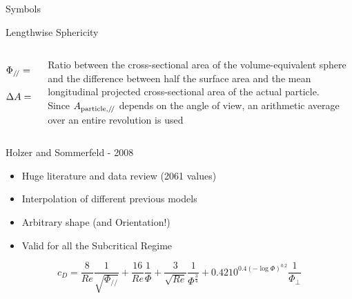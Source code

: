 \documentclass[11pt]{beamer}
\begin{document}
	\begin{frame}{Symbols}
		\begin{block}{Lengthwise Sphericity}
			\begin{columns}[T]
				\begin{column}{.4\textwidth}
					\begin{equation*}
					\Phi_{/\!/} = \dfrac{\frac{\pi}{4}\ d_{\textup{v}}^2} {\Delta A}
					\end{equation*}	
					\vfill		
					\begin{equation*}
					\Delta A = \dfrac{A_{\textup{p}}}{2} - \bar{A_{\textup{p},/\!/}}
					\end{equation*}
				\end{column}
				
				\begin{column}{.6\textwidth}
					Ratio between the cross-sectional area of the volume-equivalent sphere and the difference between half the surface area and the mean longitudinal projected cross-sectional area of the actual particle.\\
					Since $ A_{\textup{particle},/\!/} $ depends on the angle of view, an arithmetic average over an entire revolution is used
				\end{column}
			\end{columns}
		\end{block}
	\end{frame}

	\begin{frame}{Holzer and Sommerfeld - 2008}
		\begin{itemize}
			\item Huge literature and data review (2061 values)
			\item Interpolation of different previous models
			\item Arbitrary shape (and Orientation!)
			\item Valid for all the Subcritical Regime
		\end{itemize}
	
		\begin{equation*}
			c_D = \frac{8}{Re} \frac{1}{\sqrt{\Phi_{/\!/}}} + \frac{16}{Re} \frac{1}{\Phi} + \frac{3}{\sqrt{Re}} \frac{1}{\Phi^{\frac{3}{4}}} + 0.4210^{0.4(-\log \Phi)^{0.2}} \frac{1}{\Phi_{\perp}}
		\end{equation*}
	\end{frame}

%
\end{document}
